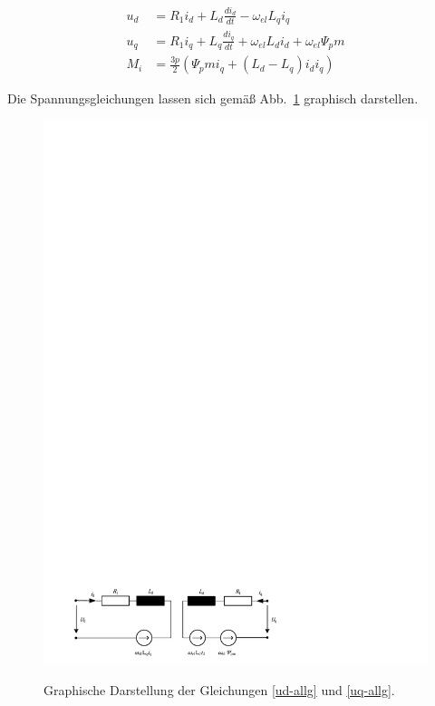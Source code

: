 \begin{align}
u_d &= R_1 i_d + L_d \frac{di_d}{dt} - \omega_{el}L_q i_q  \label{uq-allg} \\ 
u_q &= R_1 i_q + L_q \frac{di_q}{dt} + \omega_{el}L_d i_d + \omega_{el}\Psi_pm \label{ud-allg} \\ 
M_i &= \frac{3p}{2}(\Psi_pm i_q + (L_d - L_q)i_d i_q)
\end{align}

Die Spannungsgleichungen lassen sich gemäß Abb.~\ref{fig:spannungsgleichungen} graphisch darstellen.

\begin{figure}
\centering
\includegraphics[width=\columnwidth]{img/spannungsgleichungen}
\label{fig:spannungsgleichungen}
\caption{Graphische Darstellung der Gleichungen \ref{ud-allg} und \ref{uq-allg}.}
\end{figure}
